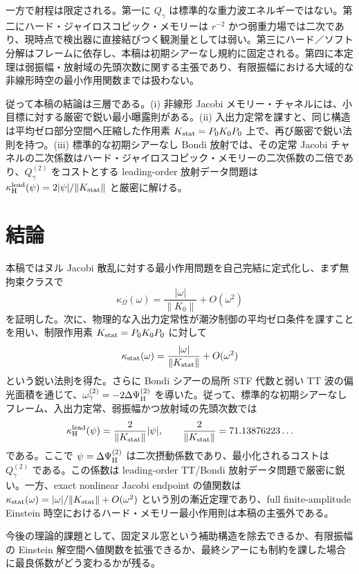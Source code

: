 一方で射程は限定される。第一に $Q_\gamma$ は標準的な重力波エネルギーではない。第二にハード・ジャイロスコピック・メモリーは $r^{-2}$ かつ弱重力場では二次であり、現時点で検出器に直接結びつく観測量としては弱い。第三にハード／ソフト分解はフレームに依存し、本稿は初期シアーなし規約に固定される。第四に本定理は弱振幅・放射域の先頭次数に関する主張であり、有限振幅における大域的な非線形時空の最小作用関数までは扱わない。

従って本稿の結論は三層である。(i) 非線形 Jacobi メモリー・チャネルには、小目標に対する厳密で鋭い最小曝露則がある。(ii) 入出力定常を課すと、同じ構造は平均ゼロ部分空間へ圧縮した作用素 $K_{\rm stat}=P_0K_0P_0$ 上で、再び厳密で鋭い法則を持つ。(iii) 標準的な初期シアーなし Bondi 放射では、その定常 Jacobi チャネルの二次係数はハード・ジャイロスコピック・メモリーの二次係数の二倍であり、$Q_\gamma^{(2)}$ をコストとする leading-order 放射データ問題は $\kappa_{\rm H}^{\rm lead}(\psi)=2|\psi|/\|K_{\rm stat}\|$ と厳密に解ける。

\section{結論}
本稿ではヌル Jacobi 散乱に対する最小作用問題を自己完結に定式化し、まず無拘束クラスで
\[
\kappa_\Omega(\omega)=\frac{|\omega|}{\|K_0\|}+O(\omega^2)
\]
を証明した。次に、物理的な入出力定常性が潮汐制御の平均ゼロ条件を課すことを用い、制限作用素 $K_{\rm stat}=P_0K_0P_0$ に対して
\[
\kappa_{\rm stat}(\omega)=\frac{|\omega|}{\|K_{\rm stat}\|}+O(\omega^2)
\]
という鋭い法則を得た。さらに Bondi シアーの局所 STF 代数と弱い TT 波の偏光面積を通じて、$\omega_\gamma^{(2)}=-2\Delta\Psi_{\rm H}^{(2)}$ を導いた。従って、標準的な初期シアーなしフレーム、入出力定常、弱振幅かつ放射域の先頭次数では
\[
\kappa_{\rm H}^{\rm lead}(\psi)=\frac{2}{\|K_{\rm stat}\|}|\psi|,
\qquad
\frac{2}{\|K_{\rm stat}\|}=71.13876223\ldots
\]
である。ここで $\psi=\Delta\Psi_{\rm H}^{(2)}$ は二次摂動係数であり、最小化されるコストは $Q_\gamma^{(2)}$ である。この係数は leading-order TT/Bondi 放射データ問題で厳密に鋭い。一方、exact nonlinear Jacobi endpoint の値関数は
$\kappa_{\rm stat}(\omega)=|\omega|/\|K_{\rm stat}\|+O(\omega^2)$
という別の漸近定理であり、full finite-amplitude Einstein 時空におけるハード・メモリー最小作用則は本稿の主張外である。

今後の理論的課題として、固定ヌル窓という補助構造を除去できるか、有限振幅の Einstein 解空間へ値関数を拡張できるか、最終シアーにも制約を課した場合に最良係数がどう変わるかが残る。
